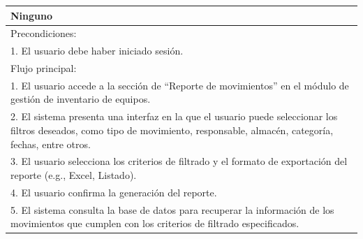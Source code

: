 \documentclass[stu, 12pt, letterpaper, donotrepeattitle, floatsintext, natbib]{apa7}
\begin{document}
\begin{longtable}{@{} p{16.5cm} @{}}
    Ninguno                                                                                                                                                                                                                                                                        \\ \midrule
    Precondiciones:                                                                                                                                                                                                                                                                \\
    1. El usuario debe haber iniciado sesión.                                                                                                                                                                                                                                      \\ \midrule
    Flujo principal:                                                                                                                                                                                                                                                               \\
    1. El usuario accede a la sección de ``Reporte de movimientos'' en el módulo de gestión de inventario de equipos.                                                                                                                                                              \\
    2. El sistema presenta una interfaz en la que el usuario puede seleccionar los filtros deseados, como tipo de movimiento, responsable, almacén, categoría, fechas, entre otros.                                                                                                \\
    3. El usuario selecciona los criterios de filtrado y el formato de exportación del reporte (e.g., Excel, Listado).                                                                                                                                                             \\
    4. El usuario confirma la generación del reporte.                                                                                                                                                                                                                              \\
    5. El sistema consulta la base de datos para recuperar la información de los movimientos que cumplen con los criterios de filtrado especificados.                                                                                                                              \\

\end{longtable}
\end{document}
